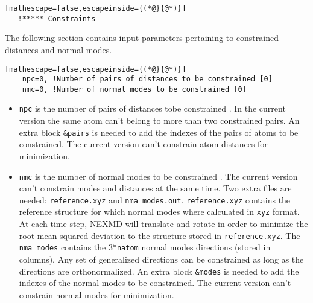 \begin{lstlisting}[mathescape=false,escapeinside={(*@}{@*)}]
   !***** Constraints
\end{lstlisting}
\noindent The following section contains input parameters pertaining to constrained distances and normal modes.
\begin{lstlisting}[mathescape=false,escapeinside={(*@}{@*)}]
    npc=0, !Number of pairs of distances to be constrained [0]
    nmc=0, !Number of normal modes to be constrained [0]
\end{lstlisting}
\begin{itemize}
    \item \verb+npc+ is the number of pairs of distances tobe constrained \cite{andersen1983rattle}. In the current version the same atom can't belong to more than two constrained pairs. An extra block \verb+&pairs+ is needed to add the indexes of the pairs of atoms to be constrained. The current version can't constrain atom distances for minimization.
    \item \verb+nmc+ is the number of normal modes to be constrained \cite{negrin2020photoinduced}. The current version can't constrain modes and distances at the same time. Two extra files are needed: \verb+reference.xyz+ and \verb+nma_modes.out+. \verb+reference.xyz+ contains the reference structure for which normal modes where calculated in \verb+xyz+ format. At each time step, NEXMD will translate and rotate in order to minimize the root mean squared deviation to the structure stored in \verb+reference.xyz+. The \verb+nma_modes+ contains the 3*\verb+natom+ normal modes directions (stored in columns). Any set of generalized directions can be constrained as long as the directions are orthonormalized. An extra block \verb+&modes+ is needed to add the indexes of the normal modes to be constrained. The current version can't constrain normal modes for minimization.
\end{itemize}

